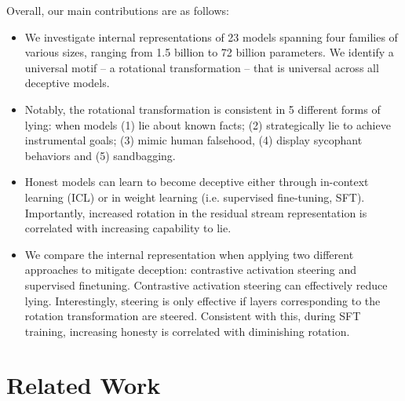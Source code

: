 \documentclass[]{paper}
\begin{document}
Overall, our main contributions are as follows:


\begin{itemize}


\item We investigate internal representations of 23 models spanning four families of various sizes, ranging from 1.5 billion to 72 billion parameters. We identify a universal motif – a rotational transformation – that is universal across all deceptive models. 

\item Notably, the rotational transformation is consistent in 5 different forms of lying: when models (1) lie about known facts; (2) strategically lie to achieve instrumental goals; (3) mimic human falsehood, (4) display sycophant behaviors and (5)  sandbagging.  

\item Honest models can learn to become deceptive either through in-context learning (ICL) or in weight learning (i.e. supervised fine-tuning, SFT). Importantly, increased rotation in the residual stream representation is correlated with increasing capability to lie.

\item  We compare the internal representation when applying two different approaches to mitigate deception: contrastive activation steering and supervised finetuning. Contrastive activation steering can effectively reduce lying. Interestingly, steering is only effective if layers corresponding to the rotation transformation are steered. Consistent with this, during SFT training, increasing honesty is correlated with diminishing rotation.

\end{itemize}

\section{Related Work}
\end{document}
